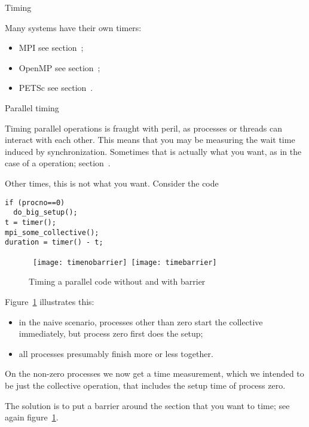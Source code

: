 
 {Timing}

Many systems have their own timers:
\begin{itemize}
\item MPI see section~;
\item OpenMP see section~;
\item PETSc see section~.
\end{itemize}

 {Parallel timing}

Timing parallel operations is fraught with peril,
as processes or threads can interact with each other.
This means that you may be measuring the wait time
induced by synchronization.
Sometimes that is actually what you want,
as in the case of a  operation;
section~.

Other times, this is not what you want.
Consider the code
\begin{lstlisting}
if (procno==0)
  do_big_setup();
t = timer();
mpi_some_collective();
duration = timer() - t;
\end{lstlisting}

\begin{figure}[ht]
  \hbox\bgroup
  \texttt{[image: timenobarrier]}
  \texttt{[image: timebarrier]}
  \egroup
  \caption{Timing a parallel code without and with barrier}
  \label{fig:time-collective}
\end{figure}

Figure~\ref{fig:time-collective} illustrates this:
\begin{itemize}
\item in the naive scenario, processes other than zero start the collective immediately,
  but process zero first does the setup;
\item all processes presumably finish more or less together.
\end{itemize}
On the non-zero processes we now get a time measurement,
which we intended to be just the collective operation,
that includes the setup time of process zero.

The solution is to put a barrier around the section that you want to time;
see again figure~\ref{fig:time-collective}.

